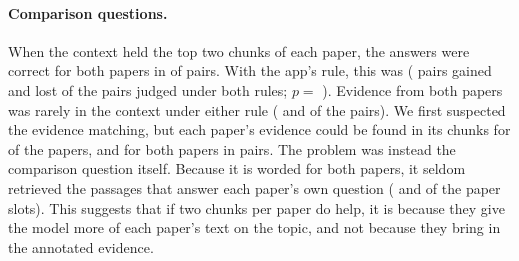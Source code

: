 \paragraph{Comparison questions.} When the context held the top two chunks of each paper, the
answers were correct for both papers in \CompareBalancedBothCorrect{} of pairs. With the app's
rule, this was \CompareAppBothCorrect{} (\CompareGained{} pairs gained and \CompareLost{} lost of
the \CompareN{} pairs judged under both rules; $p =$ \CompareP{}). Evidence from both papers was
rarely in the context under either rule (\CompareAppBothEvidence{} and
\CompareBalancedBothEvidence{} of the \ComparePairs{} pairs). We first suspected the evidence
matching, but each paper's evidence could be found in its chunks for \ComparePapersFindable{} of
the \ComparePapers{} papers, and for both papers in \CompareFindableBoth{} pairs. The problem was
instead the comparison question itself. Because it is worded for both papers, it seldom
retrieved the passages that answer each paper's own question (\CompareAppSlots{} and
\CompareBalancedSlots{} of the \CompareAppSlotsN{} paper slots). This suggests that if two chunks
per paper do help, it is because they give the model more of each paper's text on the topic,
and not because they bring in the annotated evidence.
